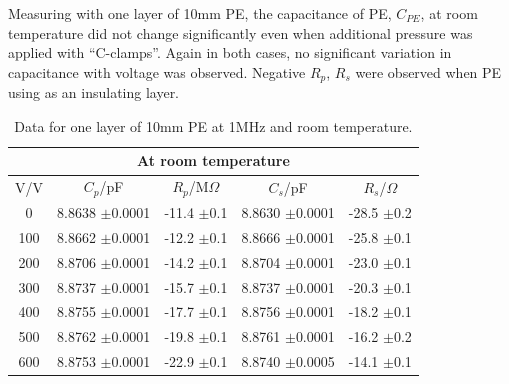 \documentclass[a4paper,11pt]{article}
\begin{document}
Measuring with one layer of 10mm PE, the capacitance of PE, $C_{PE}$, at room temperature did not change significantly even when additional pressure was applied with ``C-clamps''. Again in both cases, no significant variation in capacitance with voltage was observed. Negative $R_{p}$, $R_{s}$ were observed when PE using as an insulating layer.\\

\begin{table}[htbp]
\label{t:polyRT}
\begin{center}
	\caption{Data for one layer of 10mm PE at 1MHz and room temperature.}
\begin{tabular}{| c | c | c | c | c |}
	\hline
	\multicolumn{5}{|c|}{At room temperature}\\
	\hline
		V/V & $C_{p}$/pF & $R_{p}$/M$\Omega$ & $C_{s}$/pF & $R_{s}$/$\Omega$\\ \hline
		
		0 & 8.8638 $\pm$0.0001 & -11.4 $\pm$0.1 & 8.8630 $\pm$0.0001 & -28.5 $\pm$0.2\\ \hline
		100 & 8.8662 $\pm$0.0001 & -12.2 $\pm$0.1 & 8.8666 $\pm$0.0001 & -25.8 $\pm$0.1\\ \hline
		200 & 8.8706 $\pm$0.0001 & -14.2 $\pm$0.1 & 8.8704 $\pm$0.0001 & -23.0 $\pm$0.1\\ \hline
		300 & 8.8737 $\pm$0.0001 & -15.7 $\pm$0.1 & 8.8737 $\pm$0.0001 & -20.3 $\pm$0.1\\ \hline
		400 & 8.8755 $\pm$0.0001 & -17.7 $\pm$0.1 & 8.8756 $\pm$0.0001 & -18.2 $\pm$0.1\\ \hline
		500 & 8.8762 $\pm$0.0001 & -19.8 $\pm$0.1 & 8.8761 $\pm$0.0001 & -16.2 $\pm$0.2\\ \hline
		600 & 8.8753 $\pm$0.0001 & -22.9 $\pm$0.1 & 8.8740 $\pm$0.0005 & -14.1 $\pm$0.1 \\
	\hline
\end{tabular}
\end{center}	
\end{table}
\end{document}
